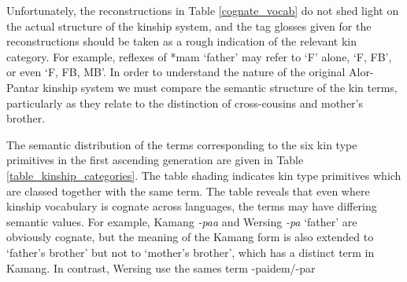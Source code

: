 Unfortunately, the reconstructions in Table \ref{cognate_vocab} do not shed light on the actual structure of the kinship system, and the tag glosses given for the reconstructions should be taken as a rough indication of the relevant kin category. For example, reflexes of *mam `father' may refer to `F' alone, `F, FB', or even `F, FB, MB'. In order to understand the nature of the original Alor-Pantar kinship system we must compare the semantic structure of the kin terms, particularly as they relate to the distinction of cross-cousins and mother's brother.

The semantic distribution of the terms corresponding to the six kin type primitives in the first ascending generation are given in Table \ref{table_kinship_categories}. The table shading indicates kin type primitives which are classed together with the same term. The table reveals that even where kinship vocabulary is cognate across languages, the terms may have differing semantic values. For example, Kamang \textit{-paa} and Wersing \textit{-pa} `father' are obviously cognate, but the meaning of the Kamang form is also extended to `father's brother' but not to `mother's brother', which has a distinct term in Kamang. In contrast, Wersing use the sames term -paidem/-par

 


